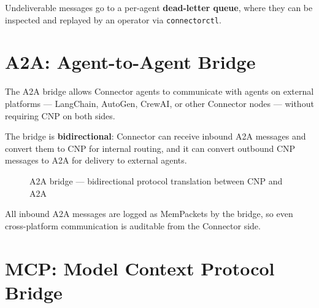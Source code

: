 Undeliverable messages go to a per-agent \textbf{dead-letter queue}, where they
can be inspected and replayed by an operator via \texttt{connectorctl}.

\section{A2A: Agent-to-Agent Bridge}

The A2A bridge allows Connector agents to communicate with agents on external
platforms — LangChain, AutoGen, CrewAI, or other Connector nodes — without
requiring CNP on both sides.

The bridge is \textbf{bidirectional}: Connector can receive inbound A2A messages
and convert them to CNP for internal routing, and it can convert outbound CNP
messages to A2A for delivery to external agents.

\begin{figure}[H]
\centering
{}
\caption{A2A bridge — bidirectional protocol translation between CNP and A2A}
\end{figure}

All inbound A2A messages are logged as MemPackets by the bridge, so even
cross-platform communication is auditable from the Connector side.

\section{MCP: Model Context Protocol Bridge}

